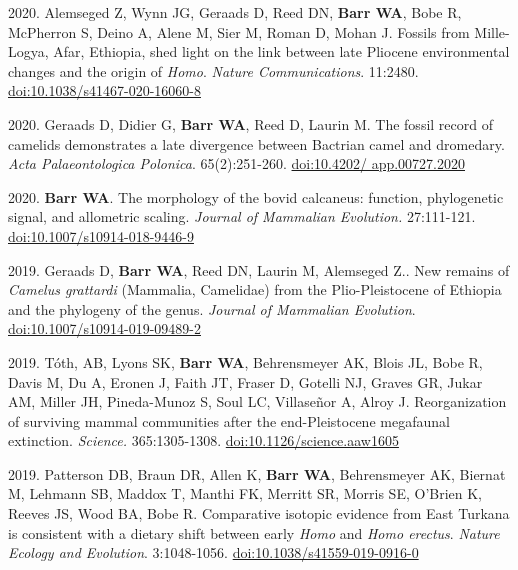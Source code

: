 \begin{etaremune}
\item 2020. Alemseged Z, Wynn JG, Geraads D, Reed DN, {\bfseries Barr WA}, Bobe R, McPherron S, Deino A, Alene M, Sier M, Roman D,  Mohan J. Fossils from Mille-Logya, Afar, Ethiopia, shed light on the link between late Pliocene environmental changes and the origin of \emph{Homo}. \emph{Nature Communications}. 11:2480. \href{https://doi.org/10.1038/s41467-020-16060-8 }{doi:10.1038/s41467-020-16060-8}

\item 2020. Geraads D, Didier G, {\bfseries Barr WA}, Reed D, Laurin M. The fossil record of camelids demonstrates a late divergence between Bactrian camel and dromedary. \emph{Acta Palaeontologica Polonica}. 65(2):251-260. \href{https://doi.org/10.4202/app.00727.2020}{doi:10.4202/ app.00727.2020}

\item 2020. {\bfseries Barr WA}. The morphology of the bovid calcaneus: function, phylogenetic signal, and allometric scaling. \emph{Journal of Mammalian Evolution.}  27:111-121. \href{https://dx.doi.org/10.1007/s10914-018-9446-9}{doi:10.1007/s10914-018-9446-9}


\item 2019. Geraads D, {\bfseries Barr WA}, Reed DN, Laurin M, Alemseged Z.. New remains of \emph{Camelus grattardi} (Mammalia, Camelidae) from the Plio-Pleistocene of Ethiopia and the phylogeny of the genus. \emph{Journal of Mammalian Evolution}. \href{https://doi.org/10.1007/s10914-019-09489-2}{doi:10.1007/s10914-019-09489-2}

\item 2019. Tóth, AB, Lyons SK, {\bfseries Barr WA}, Behrensmeyer AK, Blois JL, Bobe R, Davis M, Du A, Eronen J, Faith JT, Fraser D, Gotelli NJ, Graves GR, Jukar AM, Miller JH, Pineda-Munoz S, Soul LC, Villaseñor A, Alroy J. Reorganization of surviving mammal communities after the end-Pleistocene megafaunal extinction. \emph{Science.} 365:1305-1308. \href{https://dx.doi.org/10.1126/science.aaw1605 }{doi:10.1126/science.aaw1605}

\item 2019. Patterson DB, Braun DR, Allen K, {\bfseries Barr WA}, Behrensmeyer AK, Biernat M, Lehmann SB, Maddox T, Manthi FK, Merritt SR, Morris SE, O'Brien K, Reeves JS, Wood BA, Bobe R. Comparative isotopic evidence from East Turkana is consistent with a dietary shift between early \emph{Homo} and \emph{Homo erectus}. \emph{Nature Ecology and Evolution}. 3:1048-1056. \href{https://dx.doi.org/10.1038/s41559-019-0916-0}{doi:10.1038/s41559-019-0916-0}




\end{etaremune}
